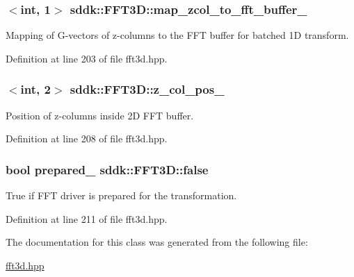 \subsubsection[{map\+\_\+zcol\+\_\+to\+\_\+fft\+\_\+buffer\+\_\+}]{$<$int, 1$>$ sddk\+::\+F\+F\+T3\+D\+::map\+\_\+zcol\+\_\+to\+\_\+fft\+\_\+buffer\+\_\+\hspace{0.3cm}{\ttfamily [protected]}}\label{classsddk_1_1_f_f_t3_d_aa9363e6990496fc3cae2c15c3d930172}


Mapping of G-\/vectors of z-\/columns to the F\+F\+T buffer for batched 1\+D transform. 



Definition at line 203 of file fft3d.\+hpp.

\hypertarget{classsddk_1_1_f_f_t3_d_aa62fe8604ebdf4b5759f945673076b39}{}
\subsubsection[{z\+\_\+col\+\_\+pos\+\_\+}]{$<$int, 2$>$ sddk\+::\+F\+F\+T3\+D\+::z\+\_\+col\+\_\+pos\+\_\+\hspace{0.3cm}{\ttfamily [protected]}}\label{classsddk_1_1_f_f_t3_d_aa62fe8604ebdf4b5759f945673076b39}


Position of z-\/columns inside 2\+D F\+F\+T buffer. 



Definition at line 208 of file fft3d.\+hpp.

\hypertarget{classsddk_1_1_f_f_t3_d_a03b624e27a337aa492f000b58b905ca9}{}
\subsubsection[{false}]{\setlength{\rightskip}{0pt plus 5cm}bool prepared\+\_\+ sddk\+::\+F\+F\+T3\+D\+::false\hspace{0.3cm}{\ttfamily [protected]}}\label{classsddk_1_1_f_f_t3_d_a03b624e27a337aa492f000b58b905ca9}


True if F\+F\+T driver is prepared for the transformation. 



Definition at line 211 of file fft3d.\+hpp.



The documentation for this class was generated from the following file\+:\begin{DoxyCompactItemize}
\item 
\hyperlink{fft3d_8hpp}{fft3d.\+hpp}\end{DoxyCompactItemize}
